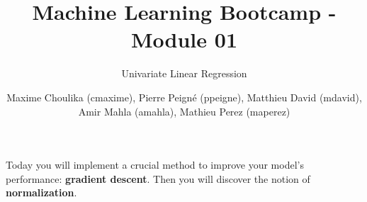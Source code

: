 \documentclass{42-en}
\begin{document}

\title{Machine Learning Bootcamp - Module 01}
\subtitle{Univariate Linear Regression}
\author{
  Maxime Choulika (cmaxime), Pierre Peigné (ppeigne), Matthieu David (mdavid), Amir Mahla (amahla), Mathieu Perez (maperez)
}

\summary
{
  Today you will implement a crucial method to improve your model's performance: \textbf{gradient descent}.
  Then you will discover the notion of \textbf{normalization}.
}

\maketitle


\newpage
\tableofcontents
\startexercices



\end{document}

